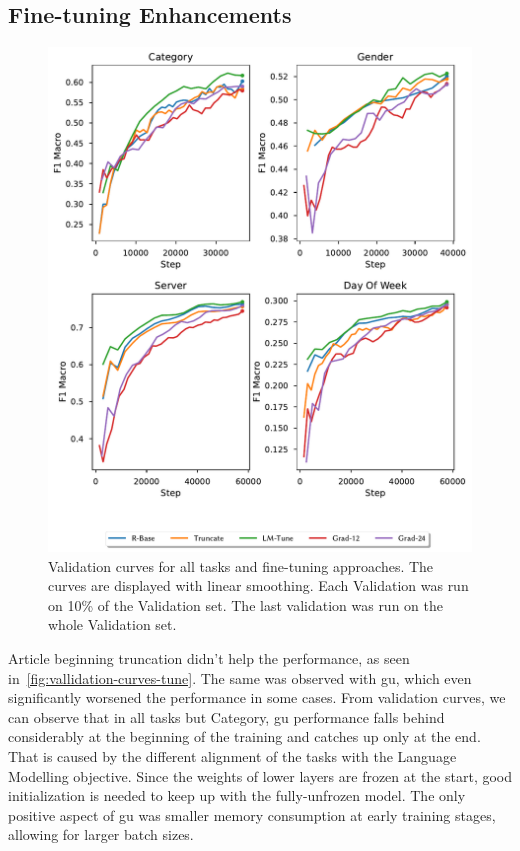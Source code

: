 \subsection{Fine-tuning Enhancements}
\begin{figure}[ht]
    \centering
    \includegraphics[width=1.0\textwidth]{graph_create/outputs/tune.pdf}
    \caption{Validation curves for all tasks and fine-tuning approaches. The curves are displayed
        with linear smoothing. Each Validation was run on 10\% of the Validation set. The last validation
        was run on the whole Validation set.}
    \label{fig:vallidation-curves-tune}
\end{figure}
Article beginning truncation didn't help the performance, as seen in~\autoref{fig:vallidation-curves-tune}.
The same was observed with \ac{gu}, which even significantly worsened the performance
in some cases. From validation curves, we can observe that in all tasks but Category,
\ac{gu} performance falls behind considerably at the beginning of the training and
catches up only at the end.
That is caused by the different alignment of the tasks with the Language Modelling objective.
Since the weights of lower layers are frozen at the start,
good initialization is needed to keep up with the fully-unfrozen model.
The only positive aspect of \ac{gu} was smaller memory consumption at early training stages,
allowing for larger batch sizes.

